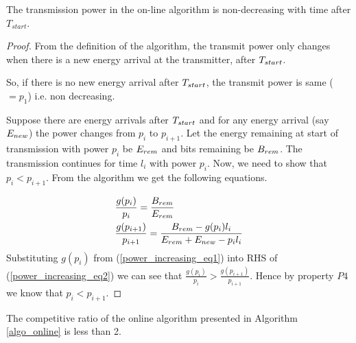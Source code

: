 \begin{lemma}
The transmission power in the on-line algorithm is non-decreasing with time after $T_{start}$.
\label{online_power}
\end{lemma}
\begin{proof}
From the definition of the algorithm, the transmit power only changes when there is a new energy arrival at the transmitter, after $T_{\mbox{\scriptsize{start}}}$. 

So, if there is no new energy arrival after $T_{\mbox{\scriptsize{start}}}$, the transmit power is same ($=p_1$) i.e. non decreasing. 

Suppose there are energy arrivals after $T_{\mbox{\scriptsize{start}}}$ and for any energy arrival (say $E_{\mbox{\scriptsize{new}}}$) the power changes from $p_i$ to $p_{i+1}$. Let the energy remaining at start of transmission with power $p_i$ be $E_{\mbox{\scriptsize{rem}}}$ and bits remaining be $B_{\mbox{\scriptsize{rem}}}$. The transmission continues for time $l_i$ with power $p_i$. Now, we need to show that $p_i<p_{i+1}$. From the algorithm we get the following equations.  

\begin{align}
&\frac{g(p_i)}{p_i}=\frac{B_{\mbox{\scriptsize{rem}}}}{E_{\mbox{\scriptsize{rem}}}} \label{power_increasing_eq1}
\\
&\frac{g(p_{i+1})}{p_{i+1}}=\frac{B_{\mbox{\scriptsize{rem}}}-g(p_i) l_i}{E_{\mbox{\scriptsize{rem}}}+E_{\mbox{\scriptsize{new}}}-p_i l_i}\label{power_increasing_eq2}
\end{align}
Substituting $g(p_i)$ from (\ref{power_increasing_eq1}) into RHS of (\ref{power_increasing_eq2}) we can see that $\frac{g(p_i)}{p_i}>\frac{g(p_{i+1})}{p_{i+1}}$. Hence by property $P4$ we know that $p_i<p_{i+1}$.
\end{proof}
\begin{theorem}
The competitive ratio of the online algorithm presented in Algorithm \ref{algo_online} is less than 2.
\end{theorem}
